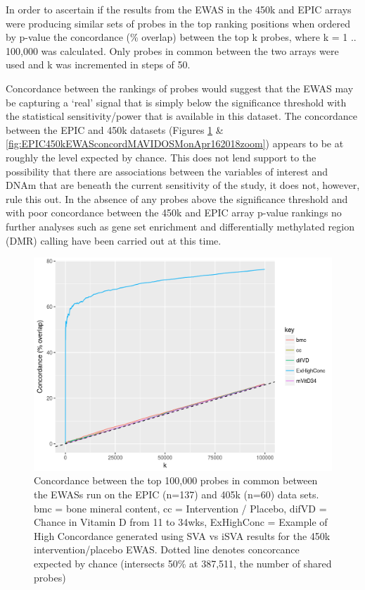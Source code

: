 \documentclass[]{book}
\begin{document}
In order to ascertain if the results from the EWAS in the 450k and EPIC arrays were producing similar sets of probes in the top ranking positions when ordered by p-value the concordance (\% overlap) between the top k probes, where k = 1 .. 100,000 was calculated. Only probes in common between the two arrays were used and k was incremented in steps of 50.

Concordance between the rankings of probes would suggest that the EWAS may be capturing a `real' signal that is simply below the significance threshold with the statistical sensitivity/power that is available in this dataset. The concordance between the EPIC and 450k datasets (Figures \ref{fig:EPIC450kEWASconcordMAVIDOSMonApr162018} \& \ref{fig:EPIC450kEWASconcordMAVIDOSMonApr162018zoom}) appears to be at roughly the level expected by chance. This does not lend support to the possibility that there are associations between the variables of interest and DNAm that are beneath the current sensitivity of the study, it does not, however, rule this out. In the absence of any probes above the significance threshold and with poor concordance between the 450k and EPIC array p-value rankings no further analyses such as gene set enrichment and differentially methylated region (DMR) calling have been carried out at this time.

\begin{figure}

{\centering \includegraphics[width=0.8\linewidth]{figs/EPIC450kEWASconcordMAVIDOSMonApr162018} 

}

\caption{Concordance between the top 100,000 probes in common between the EWASs run on the EPIC (n=137) and 405k (n=60) data sets. bmc = bone mineral content, cc = Intervention / Placebo, difVD = Chance in Vitamin D from 11 to 34wks, ExHighConc = Example of High Concordance generated using SVA vs iSVA results for the 450k intervention/placebo EWAS. Dotted line denotes concorcance expected by chance (intersects 50\% at 387,511, the number of shared probes)}\label{fig:EPIC450kEWASconcordMAVIDOSMonApr162018}
\end{figure}
\end{document}
